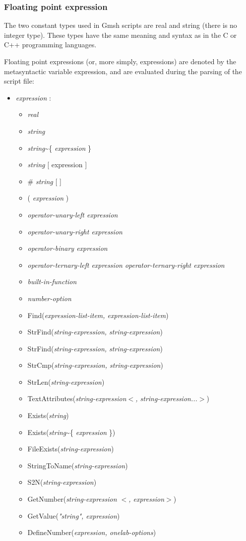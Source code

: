 \documentclass[dvipdfmx, 9pt, a4paper]{article}
\numberwithin{equation}{section}
\begin{document}
\subsubsection{Floating point expression}
The two constant types used in Gmsh scripts are real and string (there is no integer type). These types have the same meaning and syntax as in the C or C++ programming languages.\par
Floating point expressions (or, more simply, expressions) are denoted by the metasyntactic variable expression, and are evaluated during the parsing of the script file:
\begin{itemize}
\item {\it expression} :
\begin{itemize}
\item {\it real}
\item {\it string}
\item {\it string}\textasciitilde\{ {\it expression} \}
\item {\it string} [ expression ]
\item \# {\it string} [ ]
\item ( {\it expression} )
\item {\it operator-unary-left expression}
\item {\it operator-unary-right expression}
\item {\it operator-binary expression}
\item {\it operator-ternary-left expression operator-ternary-right expression}
\item {\it built-in-function}
\item {\it number-option}
\item Find({\it expression-list-item, expression-list-item})
\item StrFind({\it string-expression, string-expression})
\item StrFind({\it string-expression, string-expression})
\item StrCmp({\it string-expression, string-expression})
\item StrLen({\it string-expression})
\item TextAttributes({\it string-expression$<$, string-expression...$>$})
\item Exists({\it string})
\item Exists({\it string}\textasciitilde\{ {\it expression} \})
\item FileExists({\it string-expression})
\item StringToName({\it string-expression})
\item S2N({\it string-expression})
\item GetNumber({\it string-expression $<$, expression$>$})
\item GetValue({\it "string", expression})
\item DefineNumber({\it expression, onelab-options})
\end{itemize}
\end{itemize}
\end{document}
